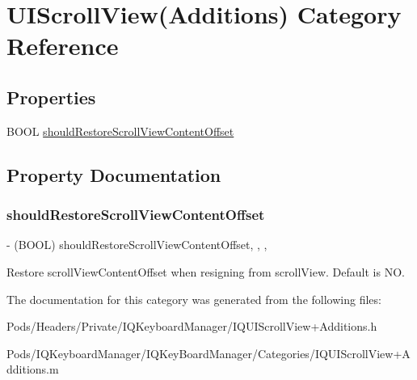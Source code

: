 \hypertarget{category_u_i_scroll_view_07_additions_08}{}\section{U\+I\+Scroll\+View(Additions) Category Reference}
\label{category_u_i_scroll_view_07_additions_08}
\subsection*{Properties}
\begin{DoxyCompactItemize}
\item 
B\+O\+OL \mbox{\hyperlink{category_u_i_scroll_view_07_additions_08_ab74d52d6a2bd6cfbaf6a340fce603d34}{should\+Restore\+Scroll\+View\+Content\+Offset}}
\end{DoxyCompactItemize}


\subsection{Property Documentation}
\mbox{\label{category_u_i_scroll_view_07_additions_08_ab74d52d6a2bd6cfbaf6a340fce603d34}} 
\subsubsection{\texorpdfstring{should\+Restore\+Scroll\+View\+Content\+Offset}{shouldRestoreScrollViewContentOffset}}
{\footnotesize\ttfamily -\/ (B\+O\+OL) should\+Restore\+Scroll\+View\+Content\+Offset\hspace{0.3cm}{\ttfamily [read]}, {\ttfamily [write]}, {\ttfamily [nonatomic]}, {\ttfamily [assign]}}

Restore scroll\+View\+Content\+Offset when resigning from scroll\+View. Default is NO. 

The documentation for this category was generated from the following files\+:\begin{DoxyCompactItemize}
\item 
Pods/\+Headers/\+Private/\+I\+Q\+Keyboard\+Manager/I\+Q\+U\+I\+Scroll\+View+\+Additions.\+h\item 
Pods/\+I\+Q\+Keyboard\+Manager/\+I\+Q\+Key\+Board\+Manager/\+Categories/I\+Q\+U\+I\+Scroll\+View+\+Additions.\+m\end{DoxyCompactItemize}
